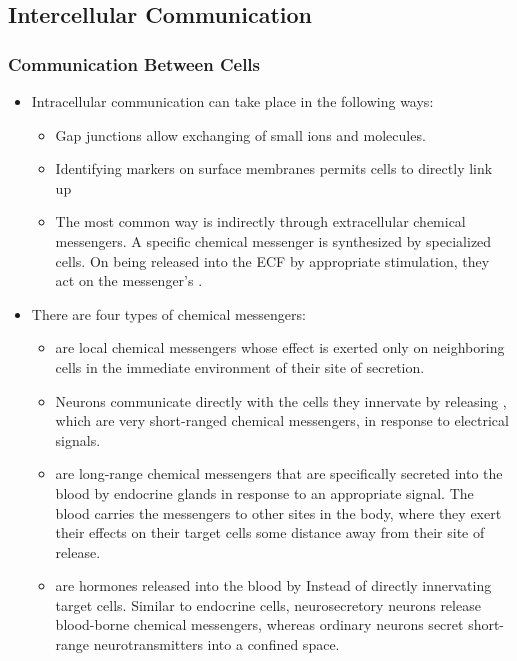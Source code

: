 \documentclass{article}
\numberwithin{equation}{section}
\begin{document}
\begin{itemize}
\begin{center}
    \end{center}
\end{itemize}
\subsection{Intercellular Communication}
\subsubsection{Communication Between Cells}
\begin{itemize}
    \item Intracellular communication can take place in the following ways:
    \begin{itemize}
        \item Gap junctions allow exchanging of small ions and molecules.
        \item Identifying markers on surface membranes permits cells to directly link up
        \item The most common way is indirectly through extracellular chemical messengers. A specific chemical messenger is synthesized by specialized cells. On being released into the ECF by appropriate stimulation, they act on the messenger's .
    \end{itemize}
    \item There are four types of chemical messengers:
    \begin{itemize}
        \item {} are local chemical messengers whose effect is exerted only on neighboring cells in the immediate environment of their site of secretion.
        \item Neurons communicate directly with the cells they innervate by releasing , which are very short-ranged chemical messengers, in response to electrical signals.
        \item {} are long-range chemical messengers that are specifically secreted into the blood by endocrine glands in response to an appropriate signal. The blood carries the messengers to other sites in the body, where they exert their effects on their target cells some distance away from their site of release.
        \item {} are hormones released into the blood by  Instead of directly innervating target cells. Similar to endocrine cells, neurosecretory neurons release blood-borne chemical messengers, whereas ordinary neurons secret short-range neurotransmitters into a confined space. 

\end{itemize}
\end{itemize}
\end{document}
